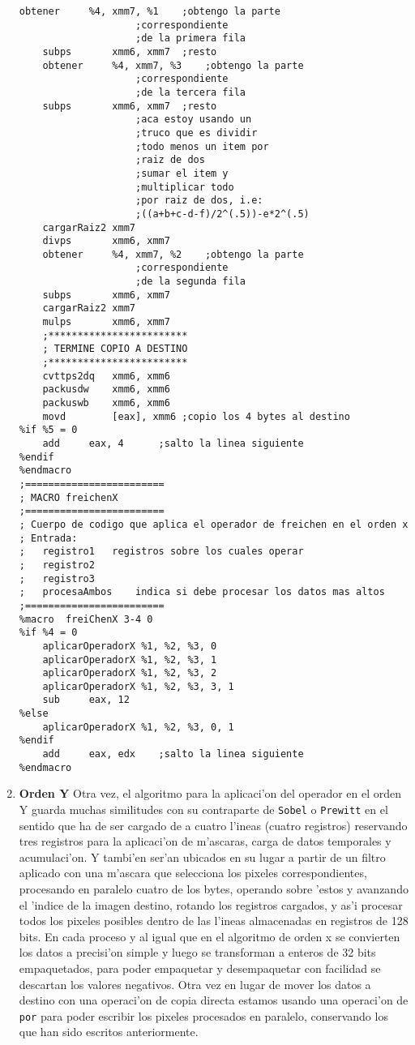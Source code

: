 \documentclass[11pt]{article}
\begin{document}
\begin{enumerate}
\begin{lstlisting}[frame=single]
	obtener		%4, xmm7, %1	;obtengo la parte
					;correspondiente
					;de la primera fila
	subps		xmm6, xmm7	;resto
	obtener		%4, xmm7, %3	;obtengo la parte
					;correspondiente
					;de la tercera fila
	subps		xmm6, xmm7	;resto
					;aca estoy usando un
					;truco que es dividir
					;todo menos un item por
					;raiz de dos
					;sumar el item y
					;multiplicar todo
					;por raiz de dos, i.e: 
					;((a+b+c-d-f)/2^(.5))-e*2^(.5)
	cargarRaiz2	xmm7
	divps		xmm6, xmm7
	obtener		%4, xmm7, %2	;obtengo la parte
					;correspondiente
					;de la segunda fila
	subps		xmm6, xmm7
	cargarRaiz2	xmm7
	mulps		xmm6, xmm7
	;************************
	; TERMINE COPIO A DESTINO
	;************************
	cvttps2dq	xmm6, xmm6
	packusdw	xmm6, xmm6
	packuswb	xmm6, xmm6
	movd		[eax], xmm6	;copio los 4 bytes al destino
%if %5 = 0
	add		eax, 4		;salto la linea siguiente
%endif
%endmacro
;========================
; MACRO freichenX
;========================
; Cuerpo de codigo que aplica el operador de freichen en el orden x
; Entrada:
;	registro1	registros sobre los cuales operar 
;	registro2
;	registro3
;	procesaAmbos	indica si debe procesar los datos mas altos
;========================
%macro	freiChenX 3-4 0
%if %4 = 0
	aplicarOperadorX %1, %2, %3, 0
	aplicarOperadorX %1, %2, %3, 1
	aplicarOperadorX %1, %2, %3, 2
	aplicarOperadorX %1, %2, %3, 3, 1
	sub		eax, 12
%else
	aplicarOperadorX %1, %2, %3, 0, 1
%endif
	add		eax, edx	;salto la linea siguiente
%endmacro
\end{lstlisting}
\item \textbf{Orden Y}
\subitem Otra vez, el algoritmo para la aplicaci'on del operador en el orden Y guarda muchas similitudes con su contraparte de \verb'Sobel' o \verb'Prewitt' en el sentido que ha de ser cargado de a cuatro l'ineas (cuatro registros) reservando tres registros para la aplicaci'on de m'ascaras, carga de datos temporales y acumulaci'on.  Y tambi'en ser'an ubicados en su lugar a partir de un filtro aplicado con una m'ascara que selecciona los pixeles correspondientes, procesando en paralelo cuatro de los bytes, operando sobre 'estos y avanzando el 'indice de la imagen destino, rotando los registros cargados, y as'i procesar todos los pixeles posibles dentro de las l'ineas almacenadas en registros de 128 bits.  En cada proceso y al igual que en el algoritmo de orden x se convierten los datos a precisi'on simple y luego se transforman a enteros de 32 bits empaquetados, para poder empaquetar y desempaquetar con facilidad se descartan los valores negativos.  Otra vez en lugar de mover los datos a destino con una operaci'on de copia directa estamos usando una operaci'on de \verb'por' para poder escribir los pixeles procesados en paralelo, conservando los que han sido escritos anteriormente.

\end{enumerate}
\end{document}
